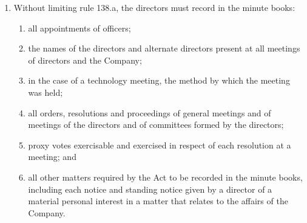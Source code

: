 \begin{enumerate}[label=(\alph*)]
    \item Without limiting rule 138.a, the directors must record in the minute books:
    \begin{enumerate}[label=(\roman*)]
        \item all appointments of officers;
        \item the names of the directors and alternate directors present at all meetings of directors and the Company;
        \item in the case of a technology meeting, the method by which the meeting was held;
        \item all orders, resolutions and proceedings of general meetings and of meetings of the directors and of committees formed by the directors;
        \item proxy votes exercisable and exercised in respect of each resolution at a meeting; and
        \item all other matters required by the Act to be recorded in the minute books, including each notice and standing notice given by a director of a material personal interest in a matter that relates to the affairs of the Company.
    \end{enumerate}
\end{enumerate} 
